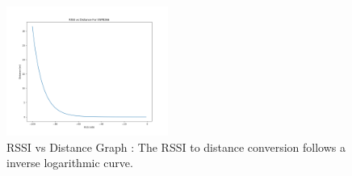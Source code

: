 \documentclass{report}
\begin{document}
\clearpage
\begin{figure}[h!]
    \centering
    \includegraphics[width=200]{RSSI_vs_Distance_for_ESP8266.png}
    \caption{RSSI vs Distance Graph : The RSSI to distance conversion follows a inverse logarithmic curve.}
    \label{fig:rssiToDistanceGraph}
\end{figure} \\
\end{document}
